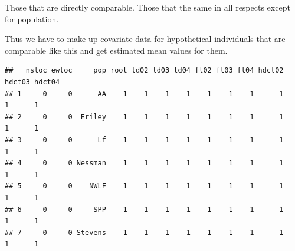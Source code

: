 \documentclass[
  ignorenonframetext,
]{beamer}
\newenvironment{Shaded}{\begin{snugshade}}{\end{snugshade}}
\newcommand{\AttributeTok}[1]{\textcolor[rgb]{0.77,0.63,0.00}{#1}}
\newcommand{\DecValTok}[1]{\textcolor[rgb]{0.00,0.00,0.81}{#1}}
\newcommand{\FunctionTok}[1]{\textcolor[rgb]{0.00,0.00,0.00}{#1}}
\newcommand{\NormalTok}[1]{#1}
\newcommand{\OtherTok}[1]{\textcolor[rgb]{0.56,0.35,0.01}{#1}}
\newcommand{\SpecialCharTok}[1]{\textcolor[rgb]{0.00,0.00,0.00}{#1}}
\begin{document}
\begin{frame}[fragile]{}
\protect\hypertarget{section-30}{}
Those that are directly comparable. Those that the same in all respects
except for population.

Thus we have to make up covariate data for hypothetical individuals that
are comparable like this and get estimated mean values for them.

\vspace{12pt}
\tiny

\begin{Shaded}
\end{Shaded}

\begin{verbatim}
##   nsloc ewloc     pop root ld02 ld03 ld04 fl02 fl03 fl04 hdct02 hdct03 hdct04
## 1     0     0      AA    1    1    1    1    1    1    1      1      1      1
## 2     0     0  Eriley    1    1    1    1    1    1    1      1      1      1
## 3     0     0      Lf    1    1    1    1    1    1    1      1      1      1
## 4     0     0 Nessman    1    1    1    1    1    1    1      1      1      1
## 5     0     0    NWLF    1    1    1    1    1    1    1      1      1      1
## 6     0     0     SPP    1    1    1    1    1    1    1      1      1      1
## 7     0     0 Stevens    1    1    1    1    1    1    1      1      1      1
\end{verbatim}
\end{frame}
\end{document}
